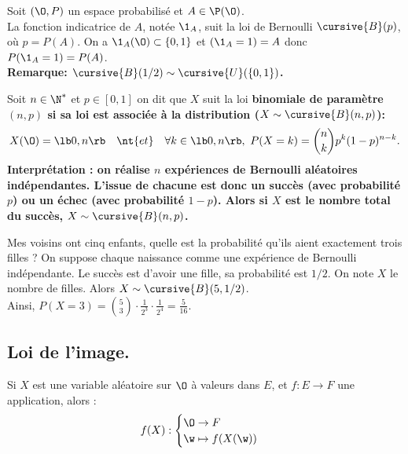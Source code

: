\documentclass[11pt]{article}
\begin{document}
\begin{prop}{}{}
    Soit $(\O,P)$ un espace probabilisé et $A\in\P(\O)$.\\
    La fonction indicatrice de $A$, notée $\1_A$, suit la loi de Bernoulli $\cursive{B}(p)$, où $p=P(A)$.
    \tcblower
    On a $\1_A(\O)\subset\{0,1\}$ et $(\1_A=1)=A$ donc $P(\1_A=1)=P(A)$.\\
    \bf{Remarque:} $\cursive{B}(1/2)\sim\cursive{U}(\{0,1\})$.
\end{prop}

\begin{defi}{}{}
    Soit $n\in\N^*$ et $p\in[0,1]$ on dit que $X$ suit la loi \bf{binomiale} de paramètre $(n,p)$ si sa loi est associée à la distribution ($X\sim\cursive{B}(n,p)$):
    \begin{equation*}
        X(\O)=\lb0,n\rb \quad \nt{et} \quad \forall k \in \lb0,n\rb, ~ P(X=k)=\binom{n}{k}p^k(1-p)^{n-k}.
    \end{equation*}
    Interprétation : on réalise $n$ expériences de Bernoulli aléatoires indépendantes. L'issue de chacune est donc un succès (avec probabilité $p$) ou un échec (avec probabilité $1-p$). Alors si $X$ est le nombre total du succès, $X\sim\cursive{B}(n,p)$.
\end{defi}

\begin{ex}{}{}
    Mes voisins ont cinq enfants, quelle est la probabilité qu'ils aient exactement trois filles ?
    \tcblower
    On suppose chaque naissance comme une expérience de Bernoulli indépendante. Le succès est d'avoir une fille, sa probabilité est $1/2$. On note $X$ le nombre de filles. Alors $X\sim\cursive{B}(5,1/2)$.\\
    Ainsi, $P(X=3)=\binom{5}{3}\cdot\frac{1}{2^3}\cdot\frac{1}{2^4}=\frac{5}{16}$.
\end{ex}

\subsection{Loi de l'image.}

\indent Si $X$ est une variable aléatoire sur $\O$ à valeurs dans $E$, et $f:E\to F$ une application, alors :
\begin{equation*}
    f(X):\begin{cases}\O\to F\\\w\mapsto f(X(\w))\end{cases}
\end{equation*}
\end{document}
